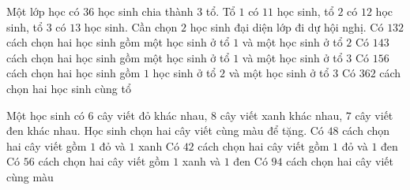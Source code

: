 
\begin{ex}%
	Một lớp học có $36$ học sinh chia thành $3$ tổ. Tổ $1$ có $11$ học sinh, tổ $2$ có $12$ học sinh, tổ $3$ có $13$ học  sinh. Cần chọn $2$ học sinh đại diện lớp đi dự hội nghị.
	\choiceTF 
		{\True Có $132$ cách  chọn hai học sinh gồm một học sinh ở tổ $1$ và một học sinh ở tổ $2$}
		{\True Có $143$ cách chọn hai học sinh gồm  một học sinh ở tổ $1$ và một học sinh ở tổ $3$}
		{\True Có $156$ cách chọn hai học sinh gồm $1$ học sinh ở  tổ $2$ và một học sinh ở tổ $3$}
		{Có $362$ cách  chọn hai học sinh cùng tổ}
\end{ex}

\begin{ex}%
	Một học sinh có $6$ cây viết đỏ khác nhau, $8$ cây viết xanh khác nhau, $7$ cây  viết đen khác nhau. Học sinh chọn hai cây viết cùng màu để tặng.
	 \choiceTF
		{\True Có  $48$ cách chọn hai cây viết gồm $1$ đỏ và $1$ xanh}
		{\True Có $42$ cách chọn  hai cây viết gồm $1$ đỏ và $1$ đen}
		{\True Có $56$ cách chọn hai cây viết gồm $1$ xanh và $1$ đen} 
		{Có $94$ cách chọn  hai cây viết cùng màu}
\end{ex}


